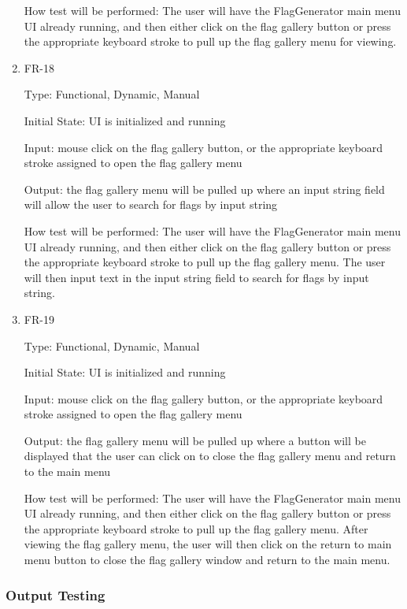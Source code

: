 \documentclass[12pt, titlepage]{article}
\begin{document}
\begin{enumerate}
How test will be performed: The user will have the FlagGenerator main menu UI
already running, and then either click on the flag gallery button or press the
appropriate keyboard stroke to pull up the flag gallery menu for viewing.

\item{FR-18\\}

Type: Functional, Dynamic, Manual

Initial State: UI is initialized and running

Input: mouse click on the flag gallery button, or the appropriate keyboard
stroke assigned to open the flag gallery menu

Output: the flag gallery menu will be pulled up where an input string field
will allow the user to search for flags by input string

How test will be performed: The user will have the FlagGenerator main menu UI
already running, and then either click on the flag gallery button or press the
appropriate keyboard stroke to pull up the flag gallery menu. The user will
then input text in the input string field to search for flags by input string.

\item{FR-19\\}

Type: Functional, Dynamic, Manual

Initial State: UI is initialized and running

Input: mouse click on the flag gallery button, or the appropriate keyboard
stroke assigned to open the flag gallery menu

Output: the flag gallery menu will be pulled up where a button will be
displayed that the user can click on to close the flag gallery menu and return
to the main menu

How test will be performed: The user will have the FlagGenerator main menu UI
already running, and then either click on the flag gallery button or press the
appropriate keyboard stroke to pull up the flag gallery menu. After viewing
the flag gallery menu, the user will then click on the return to main menu
button to close the flag gallery window and return to the main menu.

\end{enumerate}

\subsubsection{Output Testing}
		
\end{document}
